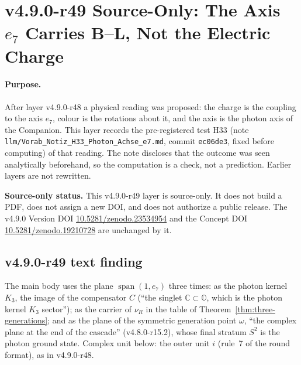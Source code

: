 \clearpage
\section*{v4.9.0-r49 Source-Only: The Axis \texorpdfstring{\(e_7\)}{e7} Carries B--L, Not the Electric Charge}
\label{sec:v490-r49-e7-axis-b-minus-l}

\paragraph{Purpose.}
After layer v4.9.0-r48 a physical reading was proposed: the charge is the coupling to the axis \(e_7\), colour is the rotations about it, and
the axis is the photon axis of the Companion.  This layer records the pre-registered test H33 (note
\texttt{llm/Vorab\_Notiz\_H33\_Photon\_Achse\_e7.md}, commit \texttt{ec06de3}, fixed before computing) of that reading.  The note discloses that the
outcome was seen analytically beforehand, so the computation is a check, not a prediction.  Earlier layers are not rewritten.

\noindent\textbf{Source-only status.}
This v4.9.0-r49 layer is source-only.  It does not build a PDF, does not assign a new DOI,
and does not authorize a public release.  The v4.9.0 Version DOI
\href{https://doi.org/10.5281/zenodo.23534954}{10.5281/zenodo.23534954} and the Concept DOI
\href{https://doi.org/10.5281/zenodo.19210728}{10.5281/zenodo.19210728} are unchanged by it.

\subsection*{v4.9.0-r49 text finding}
\label{subsec:v490-r49-text}

The main body uses the plane \(\operatorname{span}(1,e_7)\) three times: as the photon kernel \(K_3\), the image of the compensator \(C\)
(``the singlet \(\mathbb C\subset\mathbb O\), which is the photon kernel \(K_3\) sector''); as the carrier of \(\nu_R\) in the table of
Theorem~\ref{thm:three-generations}; and as the plane of the symmetric generation point \(\omega\), ``the complex plane at the end of the
cascade'' (v4.8.0-r15.2), whose final stratum \(S^2\) is the photon ground state.  Complex unit below: the outer unit \(i\) (rule~7 of the
round format), as in v4.9.0-r48.

